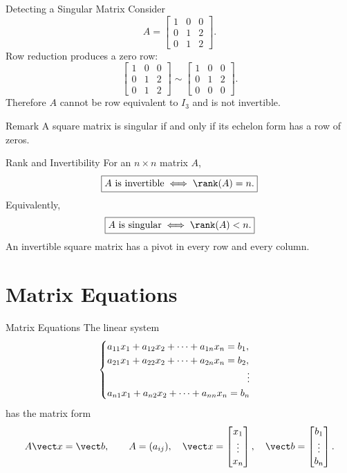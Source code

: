 \begin{frame}{Detecting a Singular Matrix}
Consider
\[
A=\begin{bmatrix}1&0&0\\0&1&2\\0&1&2\end{bmatrix}.
\]
Row reduction produces a zero row:
\[
\begin{bmatrix}1&0&0\\0&1&2\\0&1&2\end{bmatrix}
\sim
\begin{bmatrix}1&0&0\\0&1&2\\0&0&0\end{bmatrix}.
\]
Therefore $A$ cannot be row equivalent to $I_3$ and is not invertible.
\begin{block}{Remark}
A square matrix is singular if and only if its echelon form has a row of zeros.
\end{block}
\end{frame}

\begin{frame}{Rank and Invertibility}
For an $n\times n$ matrix $A$,
\[
\boxed{A\text{ is invertible}\iff \rank(A)=n.}
\]
Equivalently,
\[
\boxed{A\text{ is singular}\iff \rank(A)<n.}
\]
An invertible square matrix has a pivot in every row and every column.
\end{frame}

\section{Matrix Equations}
\begin{frame}{Matrix Equations}
The linear system
\[
\begin{cases}
a_{11}x_1+a_{12}x_2+\cdots+a_{1n}x_n=b_1,\\
a_{21}x_1+a_{22}x_2+\cdots+a_{2n}x_n=b_2,\\
\hfill\vdots\\
a_{n1}x_1+a_{n2}x_2+\cdots+a_{nn}x_n=b_n
\end{cases}
\]
has the matrix form
\[
A\vect x=\vect b,\qquad
A=(a_{ij}),\quad
\vect x=\begin{bmatrix}x_1\\\vdots\\x_n\end{bmatrix},\quad
\vect b=\begin{bmatrix}b_1\\\vdots\\b_n\end{bmatrix}.
\]
\end{frame}


